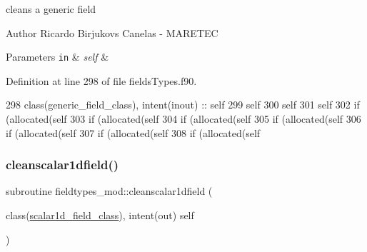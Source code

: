 cleans a generic field 

\begin{DoxyAuthor}{Author}
Ricardo Birjukovs Canelas -\/ M\+A\+R\+E\+T\+EC 
\end{DoxyAuthor}

\begin{DoxyParams}[1]{Parameters}
\mbox{\tt in}  & {\em self} & \\
\hline
\end{DoxyParams}


Definition at line 298 of file fields\+Types.\+f90.


\begin{DoxyCode}
298     \textcolor{keywordtype}{class}(generic\_field\_class), \textcolor{keywordtype}{intent(inout)} :: self
299     self%
300     self%
301     self%
302     \textcolor{keywordflow}{if} (\textcolor{keyword}{allocated}(self%
303     \textcolor{keywordflow}{if} (\textcolor{keyword}{allocated}(self%
304     \textcolor{keywordflow}{if} (\textcolor{keyword}{allocated}(self%
305     \textcolor{keywordflow}{if} (\textcolor{keyword}{allocated}(self%
306     \textcolor{keywordflow}{if} (\textcolor{keyword}{allocated}(self%
307     \textcolor{keywordflow}{if} (\textcolor{keyword}{allocated}(self%
308     \textcolor{keywordflow}{if} (\textcolor{keyword}{allocated}(self%
\end{DoxyCode}
\mbox{\label{namespacefieldtypes__mod_aeb05bd1de9be296711016ad5b607a091}} 
\subsubsection{\texorpdfstring{cleanscalar1dfield()}{cleanscalar1dfield()}}
{\footnotesize\ttfamily subroutine fieldtypes\+\_\+mod\+::cleanscalar1dfield (\begin{DoxyParamCaption}\item[{class(\mbox{\hyperlink{structfieldtypes__mod_1_1scalar1d__field__class}{scalar1d\+\_\+field\+\_\+class}}), intent(out)}]{self }\end{DoxyParamCaption})\hspace{0.3cm}{\ttfamily [private]}}



